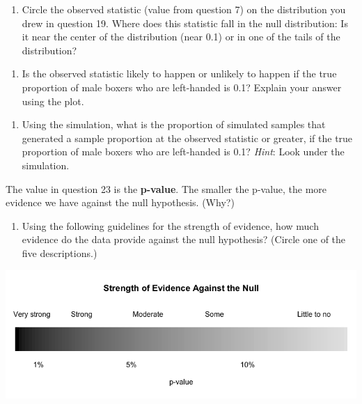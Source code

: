 \documentclass[
]{report}
\providecommand{\tightlist}{%
  \setlength{\itemsep}{0pt}\setlength{\parskip}{0pt}}
\begin{document}
\vspace{1in}

\begin{enumerate}
\def\labelenumi{\arabic{enumi}.}
\setcounter{enumi}{20}
\tightlist
\item
  Circle the observed statistic (value from question 7) on the distribution you drew in question 19. Where does this statistic fall in the null distribution: Is it near the center of the distribution (near 0.1) or in one of the tails of the distribution?
\end{enumerate}

\vspace{1in}

\begin{enumerate}
\def\labelenumi{\arabic{enumi}.}
\setcounter{enumi}{21}
\tightlist
\item
  Is the observed statistic likely to happen or unlikely to happen if the true proportion of male boxers who are left-handed is 0.1? Explain your answer using the plot.
\end{enumerate}

\vspace{1in}

\begin{enumerate}
\def\labelenumi{\arabic{enumi}.}
\setcounter{enumi}{22}
\tightlist
\item
  Using the simulation, what is the proportion of simulated samples that generated a sample proportion at the observed statistic or greater, if the true proportion of male boxers who are left-handed is 0.1? \emph{Hint}: Look under the simulation.
\end{enumerate}

\vspace{1in}

The value in question 23 is the \textbf{p-value}. The smaller the p-value, the more evidence we have against the null hypothesis. (Why?)

\begin{enumerate}
\def\labelenumi{\arabic{enumi}.}
\setcounter{enumi}{23}
\tightlist
\item
  Using the following guidelines for the strength of evidence, how much evidence do the data provide against the null hypothesis? (Circle one of the five descriptions.)
\end{enumerate}

\begin{center}\includegraphics[width=0.9\linewidth]{images/soe_gradient_grayscale} \end{center}
\end{document}
